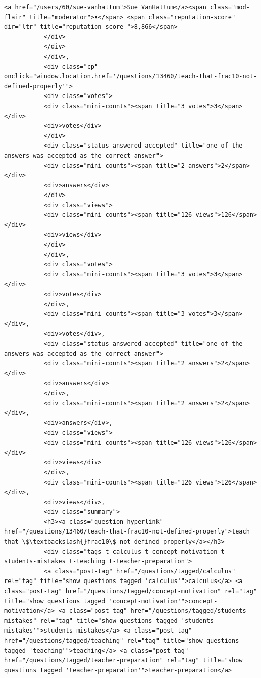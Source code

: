 \documentclass[11pt]{article}
\begin{document}
\begin{Verbatim}[commandchars=\\\{\}]
           <a href="/users/60/sue-vanhattum">Sue VanHattum</a><span class="mod-flair" title="moderator">♦</span> <span class="reputation-score" dir="ltr" title="reputation score ">8,866</span>
           </div>
           </div>
           </div>,
           <div class="cp" onclick="window.location.href='/questions/13460/teach-that-frac10-not-defined-properly'">
           <div class="votes">
           <div class="mini-counts"><span title="3 votes">3</span></div>
           <div>votes</div>
           </div>
           <div class="status answered-accepted" title="one of the answers was accepted as the correct answer">
           <div class="mini-counts"><span title="2 answers">2</span></div>
           <div>answers</div>
           </div>
           <div class="views">
           <div class="mini-counts"><span title="126 views">126</span></div>
           <div>views</div>
           </div>
           </div>,
           <div class="votes">
           <div class="mini-counts"><span title="3 votes">3</span></div>
           <div>votes</div>
           </div>,
           <div class="mini-counts"><span title="3 votes">3</span></div>,
           <div>votes</div>,
           <div class="status answered-accepted" title="one of the answers was accepted as the correct answer">
           <div class="mini-counts"><span title="2 answers">2</span></div>
           <div>answers</div>
           </div>,
           <div class="mini-counts"><span title="2 answers">2</span></div>,
           <div>answers</div>,
           <div class="views">
           <div class="mini-counts"><span title="126 views">126</span></div>
           <div>views</div>
           </div>,
           <div class="mini-counts"><span title="126 views">126</span></div>,
           <div>views</div>,
           <div class="summary">
           <h3><a class="question-hyperlink" href="/questions/13460/teach-that-frac10-not-defined-properly">teach that \$\textbackslash{}frac10\$ not defined properly</a></h3>
           <div class="tags t-calculus t-concept-motivation t-students-mistakes t-teaching t-teacher-preparation">
           <a class="post-tag" href="/questions/tagged/calculus" rel="tag" title="show questions tagged 'calculus'">calculus</a> <a class="post-tag" href="/questions/tagged/concept-motivation" rel="tag" title="show questions tagged 'concept-motivation'">concept-motivation</a> <a class="post-tag" href="/questions/tagged/students-mistakes" rel="tag" title="show questions tagged 'students-mistakes'">students-mistakes</a> <a class="post-tag" href="/questions/tagged/teaching" rel="tag" title="show questions tagged 'teaching'">teaching</a> <a class="post-tag" href="/questions/tagged/teacher-preparation" rel="tag" title="show questions tagged 'teacher-preparation'">teacher-preparation</a>

\end{Verbatim}
\end{document}
